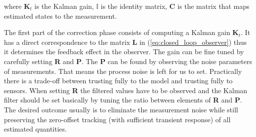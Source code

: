 where $\textbf{K}_t$ is the Kalman gain, $\mathbb{I}$ is the identity matrix, \textbf{C} is the matrix that maps estimated states to the measurement.

The first part of the correction phase consists of computing a Kalman gain $\textbf{K}_t$. It has a direct correspondence to the matrix \textbf{L} in (\ref{eq:closed_loop_observer}) thus it determines the feedback effect in the observer. The gain can be fine tuned by carefully setting \textbf{R} and \textbf{P}. The \textbf{P} can be found by observing the noise parameters of measurements. That means the process noise is left for us to set. Practically there is a trade-off between trusting fully to the model and trusting fully to sensors. When setting \textbf{R} the filtered values have to be observed and the Kalman filter should be set basically by tuning the ratio between elements of \textbf{R} and \textbf{P}. The desired outcome usually is to eliminate the measurement noise while still preserving the zero-offset tracking (with sufficient transient response) of all estimated quantities.

